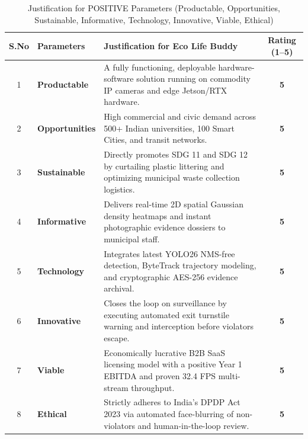 \documentclass[12pt,a4paper]{report}
\begin{document}
\begin{table}[htbp]
\centering
\caption{Justification for POSITIVE Parameters (Productable, Opportunities, Sustainable, Informative, Technology, Innovative, Viable, Ethical)}
\label{tab:positive}
\begin{tabularx}{\textwidth}{clXc}
\toprule
\textbf{S.No} & \textbf{Parameters} & \textbf{Justification for Eco Life Buddy} & \textbf{Rating (1--5)} \\
\midrule
1 & \textbf{Productable} & A fully functioning, deployable hardware-software solution running on commodity IP cameras and edge Jetson/RTX hardware. & \textbf{5} \\
\midrule
2 & \textbf{Opportunities} & High commercial and civic demand across 500+ Indian universities, 100 Smart Cities, and transit networks. & \textbf{5} \\
\midrule
3 & \textbf{Sustainable} & Directly promotes SDG 11 and SDG 12 by curtailing plastic littering and optimizing municipal waste collection logistics. & \textbf{5} \\
\midrule
4 & \textbf{Informative} & Delivers real-time 2D spatial Gaussian density heatmaps and instant photographic evidence dossiers to municipal staff. & \textbf{5} \\
\midrule
5 & \textbf{Technology} & Integrates latest YOLO26 NMS-free detection, ByteTrack trajectory modeling, and cryptographic AES-256 evidence archival. & \textbf{5} \\
\midrule
6 & \textbf{Innovative} & Closes the loop on surveillance by executing automated exit turnstile warning and interception before violators escape. & \textbf{5} \\
\midrule
7 & \textbf{Viable} & Economically lucrative B2B SaaS licensing model with a positive Year 1 EBITDA and proven 32.4 FPS multi-stream throughput. & \textbf{5} \\
\midrule
8 & \textbf{Ethical} & Strictly adheres to India's DPDP Act 2023 via automated face-blurring of non-violators and human-in-the-loop review. & \textbf{5} \\
\bottomrule
\end{tabularx}
\end{table}
\end{document}
